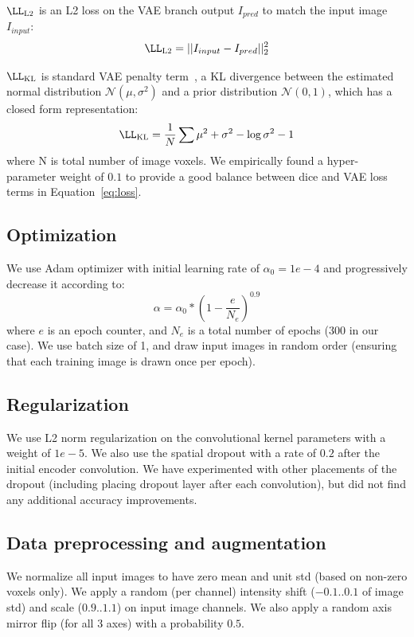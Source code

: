 \documentclass[runningheads]{llncs}
\begin{document}
$\LL_{\textsc{L2}}$ is an L2 loss on the VAE branch output $I_{pred}$ to match the input image $I_{input}$:
   \begin{equation}
  	\label{eq:vael2}
  	\LL_{\textsc{L2}}   =|| I_{input} - I_{pred}||_2^2
  \end{equation}
  
$\LL_{\textsc{KL}}$  is standard VAE penalty term~\cite{Kingma14,doersch2016vae}, a KL divergence between the estimated normal distribution $\mathcal{N}(\mu,\sigma^2)$ and a prior distribution $\mathcal{N}(0,1)$, which has a closed form representation:
 \begin{equation}
\label{eq:vaekl}
\LL_{\textsc{KL}} =  \frac{1}{N} \sum  \mu^2  + \sigma^2 -  \log \sigma^2 -1
\end{equation}
where N is total number of image voxels. We empirically found a hyper-parameter weight of $0.1$ to provide a good balance between dice and VAE loss terms in Equation~\ref{eq:loss}.
    
               
  	
 \subsection{Optimization}
 We use Adam optimizer with initial learning rate of $ \alpha_{0} = 1e-4$ and progressively decrease it according to:
 \begin{equation}
 \label{eq:learningrate}
 \alpha = \alpha_{0} *\left(1-\frac{e}{N_{e}}\right)^{0.9}  
 \end{equation}
 where $e$ is an epoch counter, and $N_{e}$ is a total number of epochs (300 in our case). 
 We use batch size of 1, and draw input images in random order (ensuring that each training image is drawn once per epoch). 
 
 \subsection{Regularization}
 We use L2 norm regularization on the convolutional kernel parameters with a weight of $1e-5$.  We also use the spatial dropout with a rate of $0.2$  after the initial encoder convolution. We have experimented with other placements of the dropout (including placing dropout layer after each convolution), but did not find any additional accuracy improvements. 
 
  \subsection{Data preprocessing and augmentation}
  We normalize all input images to have zero mean and unit std (based on non-zero voxels only). We  apply a random (per channel) intensity  shift ($-0.1..0.1$  of image std) and scale ($0.9..1.1$) on input image channels.  We also apply a random axis mirror flip (for all 3 axes) with a probability $0.5$. 
\end{document}
